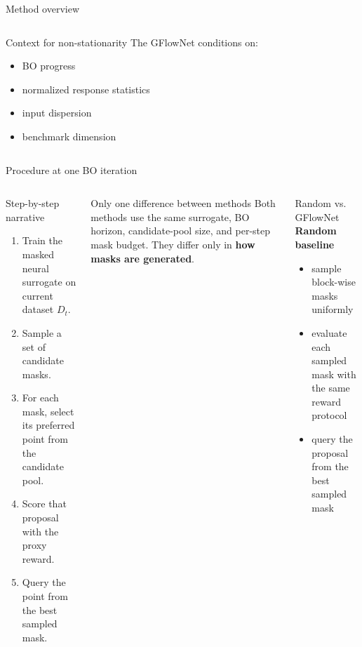 \documentclass[aspectratio=169]{beamer}
\begin{document}
\begin{frame}{Method overview}
\begin{columns}[T,onlytextwidth]
\begin{minipage}[t][0.82\textheight]{\linewidth}
  \vfill

  \begin{card}{Context for non-stationarity}
  The GFlowNet conditions on:
  \begin{itemize}
    \item BO progress
    \item normalized response statistics
    \item input dispersion
    \item benchmark dimension
  \end{itemize}
  \end{card}
\end{minipage}
\end{columns}
\end{frame}

\begin{frame}{Procedure at one BO iteration}
\vspace{-0.55em}
\begin{columns}[T,onlytextwidth]
\begin{minipage}[t][0.82\textheight]{\linewidth}\vspace{0pt}
  \begin{cardA}{Step-by-step narrative}
  \begin{enumerate}
    \item Train the masked neural surrogate on current dataset $D_t$.
    \item Sample a set of candidate masks.
    \item For each mask, select its preferred point from the candidate pool.
    \item Score that proposal with the proxy reward.
    \item Query the point from the best sampled mask.
  \end{enumerate}
  \end{cardA}

  \vfill

  \begin{card}{Only one difference between methods}
  Both methods use the same surrogate, BO horizon, candidate-pool size, and per-step mask budget. They differ only in \textbf{how masks are generated}.
  \end{card}
\end{minipage}

\begin{minipage}[t][0.82\textheight]{\linewidth}\vspace{0pt}
  \begin{cardG}{Random vs. GFlowNet}
  \textbf{Random baseline}
  \begin{itemize}
    \item sample block-wise masks uniformly
    \item evaluate each sampled mask with the same reward protocol
    \item query the proposal from the best sampled mask
  \end{itemize}


\end{cardG}
\end{minipage}
\end{columns}
\end{frame}
\end{document}
